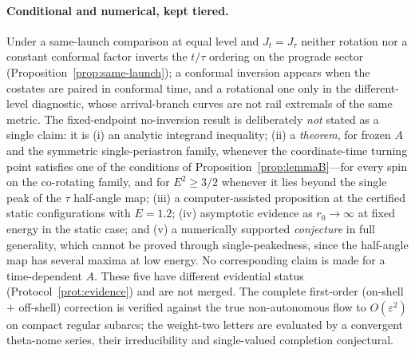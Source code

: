 \documentclass[12pt]{iopart}
\theoremstyle{plain}
\theoremstyle{definition}
\theoremstyle{remark}
\begin{document}
\paragraph{Conditional and numerical, kept tiered.} Under a same-launch comparison at equal level and
$J_t=J_\tau$ neither rotation nor a constant conformal factor inverts the $t/\tau$ ordering on
the prograde sector (Proposition~\ref{prop:same-launch}); a conformal inversion appears when
the costates are paired in conformal time, and a rotational one only in the different-level
diagnostic, whose arrival-branch curves are not rail extremals of the same metric. The fixed-endpoint
no-inversion result is deliberately \emph{not} stated as a single claim: it is
(i) an analytic integrand inequality; (ii) a \emph{theorem}, for frozen $A$ and the
symmetric single-periastron family, whenever the coordinate-time turning point satisfies
one of the conditions of Proposition~\ref{prop:lemmaB}---for every spin on the co-rotating
family, and for $E^2\ge3/2$ whenever it lies
beyond the single peak of the $\tau$ half-angle map; (iii) a computer-assisted proposition
at the certified static configurations with $E=1.2$; (iv) asymptotic evidence as
$r_0\to\infty$ at fixed energy in the static case; and (v) a numerically supported
\emph{conjecture} in full generality, which cannot be proved through single-peakedness,
since the half-angle map has several maxima at low energy. No corresponding claim is made
for a time-dependent $A$. These five have different evidential status
(Protocol~\ref{prot:evidence}) and are not merged. The complete first-order (on-shell
$+$ off-shell) correction is verified against the true non-autonomous flow to
$O(\varepsilon^2)$ on compact regular subarcs; the weight-two letters are evaluated by a
convergent theta-nome series, their irreducibility and single-valued completion
conjectural.
\end{document}
